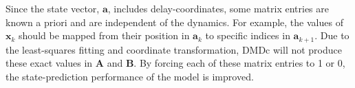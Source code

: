     Since the state vector, $\bm{a}$, includes delay-coordinates, some matrix entries are known a priori and are independent of the dynamics. 
    For example, the values of $\bm{x}_{k}$ should be mapped from their position in $\bm{a}_k$ to specific indices in $\bm{a}_{k+1}$. 
    Due to the least-squares fitting and coordinate transformation, DMDc will not produce these exact values in $\bm{A}$ and $\bm{B}$. 
    By forcing each of these matrix entries to 1 or 0, the state-prediction performance of the model is improved.




